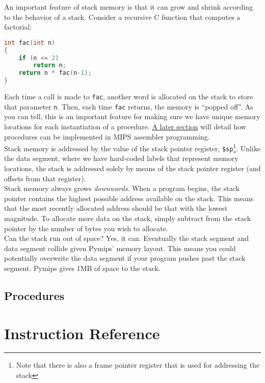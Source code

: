\documentclass[12pt]{article}
\begin{document}
An important feature of stack memory is that it can grow and shrink according to
     the behavior of a stack. Consider a recursive C function that computes a
     factorial:\\

\begin{lstlisting}[language=C]
int fac(int n)
{
    if (n <= 2)
        return n;
    return n * fac(n-1);
}
\end{lstlisting}

Each time a call is made to \texttt{fac}, another word is allocated on the stack
     to store that parameter \texttt{n}. Then, each time \texttt{fac} returns,
     the memory is ``popped off''. As you can tell, this is an important feature
     for making sure we have unique memory locations for each instantiation of a
     procedure. \hyperref[sec:proc]{A later section} will detail how procedures
     can be implemented in MIPS assembler programming.\\

Stack memory is addressed by the value of the stack pointer register,
     \texttt{\$sp}\footnote{Note that there is also a frame pointer register
     that is used for addressing the stack}. Unlike the data segment, where we
     have hard-coded labels that represent memory locations, the stack is
     addressed solely by means of the stack pointer register (and offsets from
     that register).\\

Stack memory always grows \textit{downwards}. When a program begins, the stack
     pointer contains the highest possible address available on the stack. This
     means that the most recently allocated address should be that with the
     lowest magnitude. To allocate more data on the stack, simply subtract from
     the stack pointer by the number of bytes you wish to allocate.\\

Can the stack run out of space? Yes, it can. Eventually the stack segment and
     data segment collide given Pymips' memory layout. This means you could
     potentially overwrite the data segment if your program pushes past the
     stack segment. Pymips gives 1MB of space to the stack.\\

\subsection{Procedures}
\label{sec:proc}

\section{Instruction Reference}
\label{sec:iref}
\end{document}

